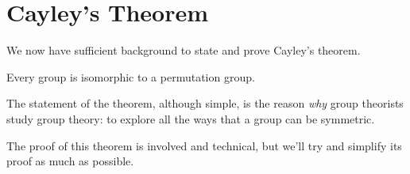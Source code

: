 \newpage

\section{Cayley's Theorem}
We now have sufficient background to state and prove Cayley's theorem.

\begin{theorem}[Cayley]\label{thrm-cayley}
    Every group is isomorphic to a permutation group.
\end{theorem}

The statement of the theorem, although simple, is the reason \textit{why} group theorists study group theory: to explore all the ways that a group can be symmetric.

The proof of this theorem is involved and technical, but we'll try and simplify its proof as much as possible.

